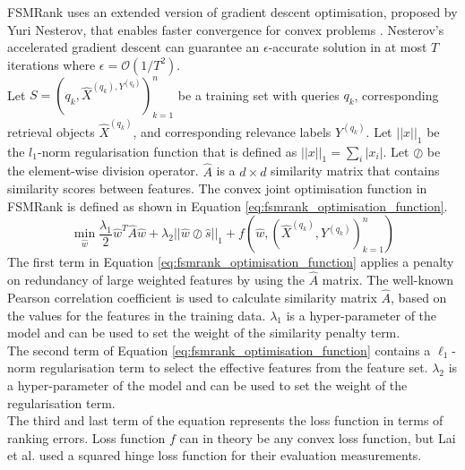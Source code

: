 FSMRank uses an extended version of gradient descent optimisation, proposed by Yuri Nesterov, that enables faster convergence for convex problems \cite{Nesterov2004}. Nesterov's accelerated gradient descent can guarantee an $\epsilon$-accurate solution in at most $T$ iterations where $\epsilon=\mathcal{O}(1/T^2)$.\\

Let $S = {(q_k, \hat{X}^{(q_k), Y^{(q_k)}})}_{k=1}^n$ be a training set with queries $q_k$, corresponding retrieval objects $\hat{X}^{(q_k)}$, and corresponding relevance labels $Y^{(q_k)}$. Let $||x||_1$ be the $l_1$-norm regularisation function that is defined as $||x||_1 = \sum\nolimits_i |x_i|$. Let $\oslash$ be the element-wise division operator. $\hat{A}$ is a $d \times d$ similarity matrix that contains similarity scores between features. The convex joint optimisation function in FSMRank is defined as shown in Equation \ref{eq:fsmrank_optimisation_function}.
\begin{equation}
\min_{\hat{w}} \frac{\lambda_1}{2} \hat{w}^T \hat{A}\hat{w} + \lambda_2 ||\hat{w}\oslash\hat{s}||_1 + f(\hat{w}, (\hat{X}^{(q_k)}, Y^{(q_k)})_{k=1}^n)
\label{eq:fsmrank_optimisation_function}
\end{equation}
\noindent The first term in Equation \ref{eq:fsmrank_optimisation_function} applies a penalty on redundancy of large weighted features by using the $\hat{A}$ matrix. The well-known Pearson correlation coefficient is used to calculate similarity matrix $\hat{A}$, based on the values for the features in the training data. $\lambda_1$ is a hyper-parameter of the model and can be used to set the weight of the similarity penalty term.\\

The second term of Equation \ref{eq:fsmrank_optimisation_function} contains a $\ell_1$-norm regularisation term to select the effective features from the feature set. $\lambda_2$ is a hyper-parameter of the model and can be used to set the weight of the regularisation term.\\

The third and last term of the equation represents the loss function in terms of ranking errors. Loss function $f$ can in theory be any convex loss function, but Lai et al. \cite{Lai2013c} used a squared hinge loss function for their evaluation measurements. 

